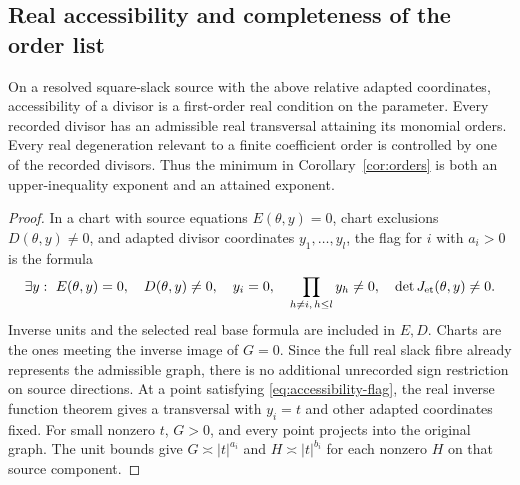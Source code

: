 \subsection{Real accessibility and completeness of the order list}
\begin{lemma}\label{lem:real-accessibility}
On a resolved square-slack source with the above relative adapted
coordinates, accessibility of a divisor is a first-order real condition
on the parameter. Every recorded divisor has an admissible real
transversal attaining its monomial orders. Every real degeneration
relevant to a finite coefficient order is controlled by one of the
recorded divisors. Thus the minimum in Corollary~\ref{cor:orders} is both
an upper-inequality exponent and an attained exponent.
\end{lemma}
\begin{proof}
In a chart with source equations $E(\theta,y)=0$, chart exclusions
$D(\theta,y)\ne0$, and adapted divisor coordinates $y_1,\ldots,y_l$,
the flag for $i$ with $a_i>0$ is the formula
\begin{equation}\label{eq:accessibility-flag}
 \exists y:\ E(\theta,y)=0,\quad D(\theta,y)\ne0,\quad
 y_i=0,\quad\prod_{h\ne i,\,h\le l}y_h\ne0,
 \quad \det J_{\rm et}(\theta,y)\ne0.
\end{equation}
Inverse units and the selected real base formula are included in $E,D$.
Charts are the ones meeting the inverse image of $G=0$. Since the full
real slack fibre already represents the admissible graph, there is no
additional unrecorded sign restriction on source directions. At a point
satisfying \eqref{eq:accessibility-flag}, the real inverse function
theorem gives a transversal with $y_i=t$ and other adapted coordinates
fixed. For small nonzero $t$, $G>0$, and every point projects into the
original graph. The unit bounds give $G\asymp |t|^{a_i}$ and
$H\asymp |t|^{b_i}$ for each nonzero $H$ on that source component.


\end{proof}
